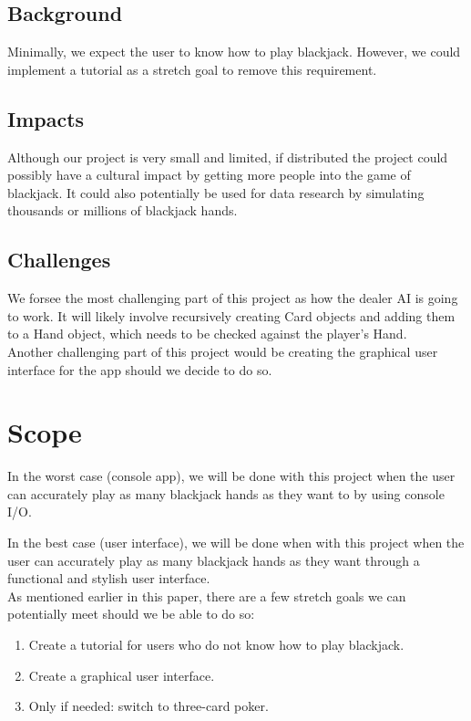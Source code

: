 \documentclass[10pt,conference,onecolumn,compsoc]{IEEEtran}
\begin{document}
\subsection{Background}
Minimally, we expect the user to know how to play blackjack. However, we could implement a tutorial as a stretch goal to remove this requirement.

\subsection{Impacts}
Although our project is very small and limited, if distributed the project could possibly have a cultural impact by getting more people into the game of blackjack. It could also potentially be used for data research by simulating thousands or millions of blackjack hands.
\subsection{Challenges}
We forsee the most challenging part of this project as how the dealer AI is going to work. It will likely involve recursively creating Card objects and adding them to a Hand object, which needs to be checked against the player's Hand.\\
Another challenging part of this project would be creating the graphical user interface for the app should we decide to do so.


\section{Scope}
In the worst case (console app), we will be done with this project when the user can accurately play as many blackjack hands as they want to by using console I/O.

In the best case (user interface), we will be done when with this project when the user can accurately play as many blackjack hands as they want through a functional and stylish user interface.\\
As mentioned earlier in this paper, there are a few stretch goals we can potentially meet should we be able to do so:\\

\begin{enumerate}
\item Create a tutorial for users who do not know how to play blackjack.
\item Create a graphical user interface.
\item Only if needed: switch to three-card poker.
\end{enumerate}


\end{document}
